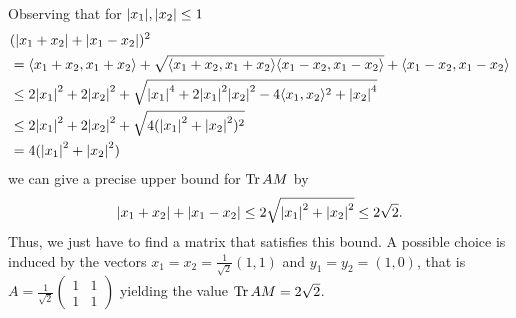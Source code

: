 Observing that for $ {\left|{x_1}\right|},{\left|{x_2}\right|}\le  1 $
\begin{align*}
	&({\left|{x_1+x_2}\right|} + {\left|{x_1-x_2}\right|})^2 \\
	&= \langle x_1+x_2,x_1+x_2\rangle  +\sqrt{\langle x_1+x_2,x_1+x_2\rangle  \langle x_1-x_2,x_1-x_2\rangle} +  \langle x_1-x_2,x_1-x_2\rangle  \\
	&\le 2{\left|{x_1}\right|}^2+2{\left|{x_2}\right|}^2 + \sqrt{{\left|{x_1}\right|}^4+2{\left|{x_1}\right|}^2{\left|{x_2}\right|}^2-4\langle x_1,x_2\rangle^2+{\left|{x_2}\right|}^4}  \\
	&\le  2{\left|{x_1}\right|}^2+2{\left|{x_2}\right|}^2 + \sqrt{4({\left|{x_1}\right|}^2+{\left|{x_2}\right|}^2)^2}  \\
	&= 4({\left|{x_1}\right|}^2+{\left|{x_2}\right|}^2)
\end{align*}
we can give a precise upper bound for $ \text{Tr} \, {AM}  $ by 
\begin{align*}
	{\left|{x_1+x_2}\right|} + {\left|{x_1-x_2}\right|} \le 2\sqrt{{\left|{x_1}\right|}^2+{\left|{x_2}\right|}^2} \le 2 \sqrt{2}.
\end{align*}
Thus, we just have to find a matrix that satisfies this bound. A possible choice is induced by the vectors $ x_1 = x_2 = \frac{1}{\sqrt{2}}(1,1) $ and $ y_1 = y_2 =(1,0) $, that is $ A = \frac{1}{\sqrt{2}}\begin{pmatrix}
1 & 1 \\ 1 & 1 
\end{pmatrix} $ yielding the value $ \text{Tr} \, {AM}  = 2 \sqrt{2} $.